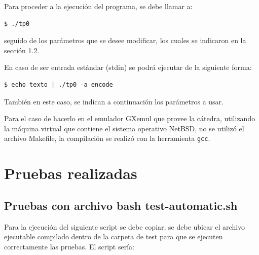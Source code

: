 \documentclass[10pt,a4paper]{article}
\begin{document}
Para proceder a la ejecución del programa, se debe llamar a:

\begin{lstlisting}
$ ./tp0
\end{lstlisting}

seguido de los parámetros que se desee modificar, los cuales se indicaron en la sección 1.2.

En caso de ser entrada estándar (stdin) se podrá ejecutar de la siguiente forma:

\begin{lstlisting}
$ echo texto | ./tp0 -a encode
\end{lstlisting}

También en este caso, se indican a continuación los parámetros a usar.

Para el caso de hacerlo en el emulador GXemul que provee la cátedra, utilizando la máquina virtual que contiene el sistema operativo NetBSD, no se utilizó el archivo Makefile, la compilación se realizó con la herramienta \texttt{gcc}.
\newpage


\section{Pruebas realizadas}


\subsection{Pruebas con archivo bash test-automatic.sh}
Para la ejecución del siguiente script se debe copiar, se debe ubicar el archivo ejecutable compilado dentro de la carpeta de test para que se ejecuten correctamente las pruebas. El script sería:
\end{document}
